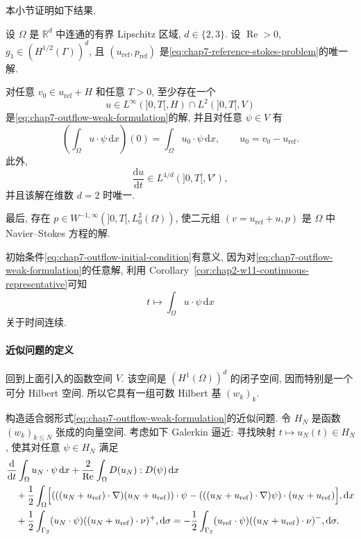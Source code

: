 \begin{sloppypar}
本小节证明如下结果.

\begin{Theorem}
\label{thm:chap7-outflow-existence-uniqueness}
设 $\Omega$ 是 $\mathbb R^d$ 中连通的有界 Lipschitz 区域, $d\in\{2,3\}$. 设 $\operatorname{Re}>0$, $g_1\in(H^{1/2}(\Gamma))^d$, 且 $(u_{\mathrm{ref}},p_{\mathrm{ref}})$ 是\eqref{eq:chap7-reference-stokes-problem}的唯一解.

对任意 $v_0\in u_{\mathrm{ref}}+H$ 和任意 $T>0$, 至少存在一个
\[
 u\in L^\infty(]0,T[,H)\cap L^2(]0,T[,V)
\]
是\eqref{eq:chap7-outflow-weak-formulation}的解, 并且对任意 $\psi\in V$ 有
\begin{equation}
 \left(\int_\Omega u\cdot\psi\,\mathrm dx\right)(0)
 =\int_\Omega u_0\cdot\psi\,\mathrm dx,
 \qquad u_0=v_0-u_{\mathrm{ref}}.
\label{eq:chap7-outflow-initial-condition}
\end{equation}
此外,
\[
 \frac{\mathrm du}{\mathrm dt}\in L^{4/d}(]0,T[,V'),
\]
并且该解在维数 $d=2$ 时唯一.

最后, 存在 $p\in W^{-1,\infty}(]0,T[,L_0^2(\Omega))$, 使二元组 $(v=u_{\mathrm{ref}}+u,p)$ 是 $\Omega$ 中 Navier--Stokes 方程的解.
\end{Theorem}

初始条件\eqref{eq:chap7-outflow-initial-condition}有意义, 因为对\eqref{eq:chap7-outflow-weak-formulation}的任意解, 利用 Corollary~\ref{cor:chap2-w11-continuous-representative}可知
\[
 t\longmapsto\int_\Omega u\cdot\psi\,\mathrm dx
\]
关于时间连续.

\paragraph{近似问题的定义}
\label{subsec:chap7-outflow-approximate-problem}

回到上面引入的函数空间 $V$. 该空间是 $(H^1(\Omega))^d$ 的闭子空间, 因而特别是一个可分 Hilbert 空间. 所以它具有一组可数 Hilbert 基 $(w_k)_k$.

构造适合弱形式\eqref{eq:chap7-outflow-weak-formulation}的近似问题. 令 $H_N$ 是函数 $(w_k)_{k\leq N}$ 张成的向量空间. 考虑如下 Galerkin 逼近: 寻找映射 $t\mapsto u_N(t)\in H_N$, 使其对任意 $\psi\in H_N$ 满足
\begin{equation}
\begin{aligned}
 &\frac{\mathrm d}{\mathrm dt}\int_\Omega u_N\cdot\psi\,\mathrm dx
 +\frac2{\operatorname{Re}}\int_\Omega D(u_N):D(\psi)\,\mathrm dx\\
 &\quad+\frac12\int_\Omega\Bigl[
 (((u_N+u_{\mathrm{ref}})\cdot\nabla)(u_N+u_{\mathrm{ref}}))\cdot\psi
 -(((u_N+u_{\mathrm{ref}})\cdot\nabla)\psi)\cdot(u_N+u_{\mathrm{ref}})
 \Bigr],\mathrm dx\\
 &\quad+\frac12\int_{\Gamma_2}(u_N\cdot\psi)
 ((u_N+u_{\mathrm{ref}})\cdot\nu)^+,\mathrm d\sigma
 =-\frac12\int_{\Gamma_2}(u_{\mathrm{ref}}\cdot\psi)
 ((u_N+u_{\mathrm{ref}})\cdot\nu)^-,\mathrm d\sigma.
\end{aligned}
\label{eq:chap7-outflow-galerkin-problem}
\end{equation}


\end{sloppypar}
